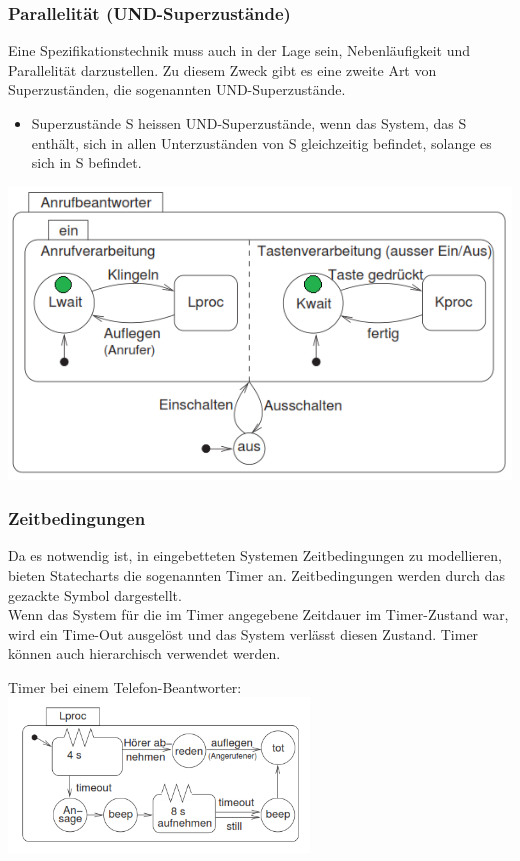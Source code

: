 \subsubsection{Parallelität (UND-Superzustände)}
\begin{multicols}{2}
Eine Spezifikationstechnik muss auch in der Lage sein, Nebenläufigkeit und Parallelität darzustellen. Zu diesem Zweck gibt es eine zweite Art von Superzuständen, die sogenannten UND-Superzustände.
\begin{itemize}
\item Superzustände S heissen UND-Superzustände, wenn das System, das S enthält, sich in allen Unterzuständen von S gleichzeitig befindet,
solange es sich in S befindet.
\end{itemize}
\vfill\null
\columnbreak
\begin{center}
\includegraphics[width=0.8\linewidth]{images/FSM/AND_super_state}
\end{center}
\end{multicols}

\subsubsection{Zeitbedingungen}
\begin{multicols}{2}
Da es notwendig ist, in eingebetteten Systemen Zeitbedingungen zu modellieren, bieten Statecharts die sogenannten Timer an. Zeitbedingungen werden durch das gezackte Symbol dargestellt.\\
Wenn das System für die im Timer angegebene Zeitdauer im Timer-Zustand war, wird ein Time-Out ausgelöst und das System verlässt diesen Zustand. Timer können auch hierarchisch verwendet werden.\\
\vfill\null
\begin{center}
\columnbreak
Timer bei einem Telefon-Beantworter:\\
\includegraphics[width=8cm]{images/FSM/timer}
\end{center}
\end{multicols}
\newpage
